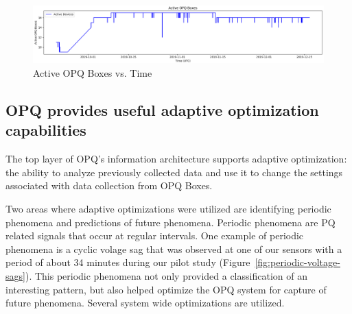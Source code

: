 \begin{figure}[ht]
    \centering
    \includegraphics[width=0.75\linewidth]{images/pilot/active-opq-boxes.png}
    \caption{Active OPQ Boxes vs. Time}
    \label{fig:active-opq-boxes}
\end{figure}


%
%


\subsection{OPQ provides useful adaptive optimization capabilities}
\label{sec:adaptive-optimization}

The top layer of OPQ's information architecture supports adaptive optimization: the ability to analyze previously collected data and use it to change the settings associated with data collection from OPQ Boxes.


Two areas where adaptive optimizations were utilized are identifying periodic phenomena and predictions of future phenomena. Periodic phenomena are PQ related signals that occur at regular intervals. One example of periodic phenomena is a cyclic volage sag that was observed at one of our sensors with a period of about 34 minutes during our pilot study (Figure~\ref{fig:periodic-voltage-sags}). This periodic phenomena not only provided a classification of an interesting pattern, but also helped optimize the OPQ system for capture of future phenomena. Several system wide optimizations are utilized.

